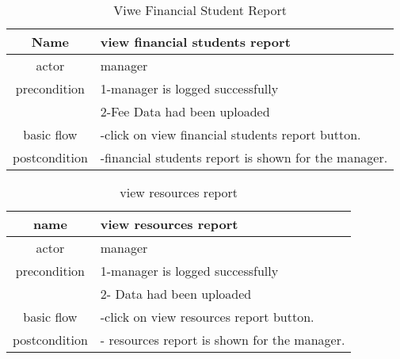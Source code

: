 \documentclass{article}
\begin{document}
     \begin{table}
     	\centering
     	\caption{Viwe Financial Student Report}
     	\label{Viwe Financial Student Report}
     	\begin{tabular}{|c|l|}
     		\hline
     		Name & view financial students report\\
     		\hline
     		actor & manager\\
     		\hline
     		precondition & 1-manager is logged successfully\\
     		& 2-Fee Data had been uploaded \\
     		\hline
     		basic flow & -click on view financial students report button.\\
     		\hline
     		postcondition & -financial students report is shown for the manager.\\
     		\hline
     	\end{tabular}
     \end{table} 	   
     \begin{table}
     	\centering
     	\caption{view resources report}
     	\label{view resources report}
     	\begin{tabular}{|c|l|}
     		\hline
     		name & view resources report\\
     		\hline
     		actor & manager \\
     		\hline
     		precondition & 1-manager is logged successfully\\
     		& 2- Data had been uploaded \\
     		\hline
     		
     		basic flow & -click on view resources report button.\\
     		\hline
     		
     		postcondition & - resources report is shown for the manager.\\
     		\hline
     	\end{tabular}
     \end{table}
     
\end{document}
